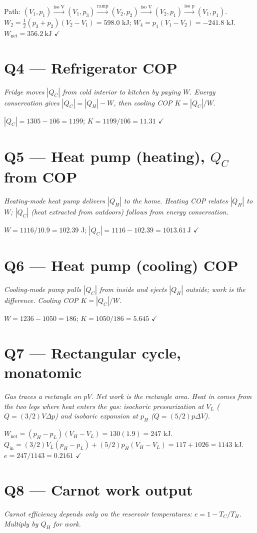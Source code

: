 \documentclass[11pt]{article}
\newcommand{\checkmk}{\ensuremath{\checkmark}}
\begin{document}
Path: $(V_1,p_1)\xrightarrow{\text{iso V}}(V_1,p_3)\xrightarrow{\text{ramp}}(V_2,p_2)\xrightarrow{\text{iso V}}(V_2,p_1)\xrightarrow{\text{iso p}}(V_1,p_1)$.
$W_2 = \tfrac12(p_3+p_2)(V_2-V_1) = 598.0$ kJ; $W_4 = p_1(V_1-V_2) = -241.8$ kJ.
$W_{\text{net}} = \boxed{356.2\ \text{kJ}}$ \checkmk

\section*{Q4 --- Refrigerator COP}
\emph{Fridge moves $|Q_C|$ from cold interior to kitchen by paying $W$. Energy conservation gives $|Q_C| = |Q_H| - W$, then cooling COP $K = |Q_C|/W$.}

$|Q_C| = 1305 - 106 = 1199$; $K = 1199/106 = \boxed{11.31}$ \checkmk

\section*{Q5 --- Heat pump (heating), $Q_C$ from COP}
\emph{Heating-mode heat pump delivers $|Q_H|$ to the home. Heating COP relates $|Q_H|$ to $W$; $|Q_C|$ (heat extracted from outdoors) follows from energy conservation.}

$W = 1116/10.9 = 102.39$ J; $|Q_C| = 1116 - 102.39 = \boxed{1013.61\ \text{J}}$ \checkmk

\section*{Q6 --- Heat pump (cooling) COP}
\emph{Cooling-mode pump pulls $|Q_C|$ from inside and ejects $|Q_H|$ outside; work is the difference. Cooling COP $K = |Q_C|/W$.}

$W = 1236 - 1050 = 186$; $K = 1050/186 = \boxed{5.645}$ \checkmk

\section*{Q7 --- Rectangular cycle, monatomic}
\emph{Gas traces a rectangle on $pV$. Net work is the rectangle area. Heat \emph{in} comes from the two legs where heat enters the gas: isochoric pressurization at $V_L$ ($Q = (3/2)V\Delta p$) and isobaric expansion at $p_H$ ($Q = (5/2)p\Delta V$).}

$W_{\text{net}} = (p_H-p_L)(V_H-V_L) = 130(1.9) = 247$ kJ.
$Q_{\text{in}} = (3/2)V_L(p_H-p_L) + (5/2)p_H(V_H-V_L) = 117 + 1026 = 1143$ kJ.
$e = 247/1143 = \boxed{0.2161}$ \checkmk

\section*{Q8 --- Carnot work output}
\emph{Carnot efficiency depends only on the reservoir temperatures: $e = 1 - T_C/T_H$. Multiply by $Q_H$ for work.}
\end{document}

